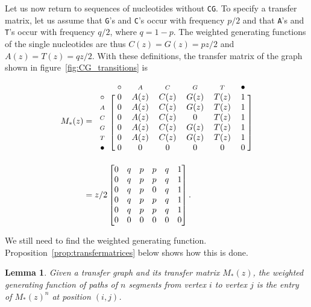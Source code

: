 \documentclass{article}
\newtheorem{lemma}{Lemma}
\newcommand{\smA}{\scriptstyle{A}}
\newcommand{\smC}{\scriptstyle{C}}
\newcommand{\smG}{\scriptstyle{G}}
\newcommand{\smT}{\scriptstyle{T}}
\begin{document}
Let us now return to sequences of nucleotides without \texttt{CG}. To
specify a transfer matrix, let us assume that \texttt{G}'s and
\texttt{C}'s occur with frequency $p/2$ and that \texttt{A}'s and
\texttt{T}'s occur with frequency $q/2$, where $q = 1-p$. The weighted
generating functions of the single nucleotides are thus $C(z) = G(z) =
pz/2$ and $A(z) = T(z) = qz/2$. With these definitions, the transfer
matrix of the graph shown in figure~\ref{fig:CG_transitions} is

\begin{align*}
M_*(z) &=
\begin{blockarray}{ccccccc}
     & \; \circ & \smA & \smC & \smG & \smT & \bullet \; \\
\begin{block}{c[cccccc]}
\circ    & \; 0 & A(z) & C(z) & G(z) & T(z) & 1 \; \\
\smA     & \; 0 & A(z) & C(z) & G(z) & T(z) & 1 \; \\
\smC     & \; 0 & A(z) & C(z) &  0   & T(z) & 1 \; \\
\smG     & \; 0 & A(z) & C(z) & G(z) & T(z) & 1 \; \\
\smT     & \; 0 & A(z) & C(z) & G(z) & T(z) & 1 \; \\
\bullet  & \; 0 &  0   &   0  &   0  &   0  & 0 \; \\
\end{block}
\end{blockarray} \\
&= 
z/2 
\begin{bmatrix}
0 & q & p & p & q & 1 \\
0 & q & p & p & q & 1 \\
0 & q & p & 0 & q & 1 \\
0 & q & p & p & q & 1 \\
0 & q & p & p & q & 1 \\
0 & 0 & 0 & 0 & 0 & 0
\end{bmatrix}.
\end{align*}

We still need to find the weighted generating function.
Proposition~\ref{prop:transfermatrices} below shows how this is done.

\begin{lemma}
\label{lemma:transfermatrices}
Given a transfer graph and its transfer matrix $M_*(z)$, the weighted
generating function of paths of $n$ segments from vertex $i$ to vertex $j$
is the entry of $M_*(z)^n$ at position $(i,j)$.
\end{lemma}
\end{document}
